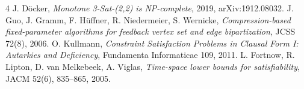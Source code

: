 \documentclass[11pt]{article}
\begin{document}
\begin{thebibliography}{4}
 J. D\"ocker, \emph{Monotone 3-Sat-(2,2)
is NP-complete}, 2019, arXiv:1912.08032.
 J. Guo, J. Gramm, F. H\"uffner,
R. Niedermeier, S. Wernicke,
\emph{Compression-based fixed-parameter algorithms for
feedback vertex set and edge bipartization},
JCSS 72(8), 2006.
 O. Kullmann, \emph{Constraint
Satisfaction Problems in Clausal Form I:
Autarkies and Deficiency}, Fundamenta Informaticae 109, 2011.
 L. Fortnow, R. Lipton, D. van Melkebeek,
A. Viglas, \emph{Time-space lower bounds for satisfiability},
JACM 52(6), 835--865, 2005.
\end{thebibliography}
\end{document}
